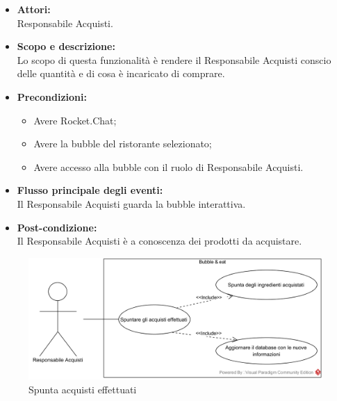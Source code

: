 
\begin{itemize}
	\item \textbf{Attori:}
	\\Responsabile Acquisti.
	\item \textbf{Scopo e descrizione:} 
	\\Lo scopo di questa funzionalità è rendere il Responsabile Acquisti conscio delle quantità e di cosa è incaricato di comprare.
	\item \textbf{Precondizioni:}
	\begin{itemize}
		\item Avere Rocket.Chat;
		\item Avere la bubble del ristorante selezionato;
		\item Avere accesso alla bubble con il ruolo di Responsabile Acquisti.
	\end{itemize}
	\item \textbf{Flusso principale degli eventi:}
	\\Il Responsabile Acquisti guarda la bubble interattiva.
	\item \textbf{Post-condizione:}
	\\Il Responsabile Acquisti è a conoscenza dei prodotti da acquistare.
\end{itemize}


\begin{figure}[H]
	\centering
	\includegraphics[width=15cm]{../../documenti/AnalisiDeiRequisiti/Diagrammi_img/uc3_8.png}
	\caption{\UCCaption{} Spunta acquisti effettuati}
\end{figure}

